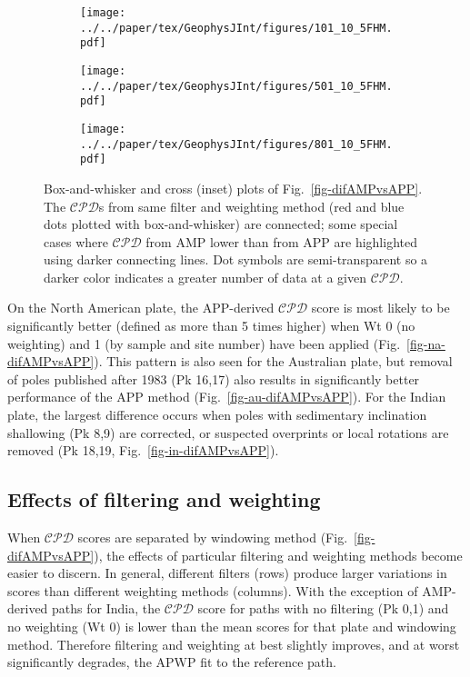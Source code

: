 \begin{figure*}
	\centering
	\begin{subfigure}{.9\textwidth}
		\texttt{[image: ../../paper/tex/GeophysJInt/figures/101\_10\_5FHM.pdf]}
		\caption{}\label{fig-na-boxAMPvsAPP}
	\end{subfigure}
	\vspace{.1em}
	\begin{subfigure}{.9\textwidth}
		\texttt{[image: ../../paper/tex/GeophysJInt/figures/501\_10\_5FHM.pdf]}
		\caption{}\label{fig-in-boxAMPvsAPP}
	\end{subfigure}
	\vspace{.1em}
	\begin{subfigure}{.9\textwidth}
		\texttt{[image: ../../paper/tex/GeophysJInt/figures/801\_10\_5FHM.pdf]}
		\caption{}\label{fig-au-boxAMPvsAPP}
	\end{subfigure}
	\caption[]{Box-and-whisker and cross (inset) plots of
Fig.~\ref{fig-difAMPvsAPP}. The $\mathcal{CPD}$s from same filter and weighting
method (red and blue dots plotted with box-and-whisker) are connected; some
special cases where $\mathcal{CPD}$ from AMP lower than from APP are highlighted
using darker connecting lines. Dot symbols are semi-transparent so a darker
color indicates a greater number of data at a given
$\mathcal{CPD}$.}\label{fig-boxAMPvsAPP}
\end{figure*}

On the North American plate, the APP-derived $\mathcal{CPD}$ score is most
likely to be significantly better (defined as more than 5 times higher) when
Wt 0 (no weighting) and 1 (by sample and site number) have been
applied (Fig.~\ref{fig-na-difAMPvsAPP}). This pattern is also seen for the
Australian plate, but removal of poles published after 1983 (Pk 16,17) also
results in significantly better performance of the APP method
(Fig.~\ref{fig-au-difAMPvsAPP}). For the Indian plate, the largest difference
occurs when poles with sedimentary inclination shallowing (Pk 8,9) are
corrected, or suspected overprints or local rotations are removed (Pk
18,19, Fig.~\ref{fig-in-difAMPvsAPP}).

\subsection{Effects of filtering and weighting}

When $\mathcal{CPD}$ scores are separated by windowing method
(Fig.~\ref{fig-difAMPvsAPP}), the effects of particular filtering and weighting
methods become easier to discern. In general, different filters (rows) produce
larger variations in scores than different weighting methods (columns). With
the exception of AMP-derived paths for India, the $\mathcal{CPD}$ score for
paths with no filtering (Pk 0,1) and no weighting (Wt
0) is lower than the mean scores for that plate and windowing method. Therefore
filtering and weighting at best slightly improves, and at worst significantly
degrades, the APWP fit to the reference path.

